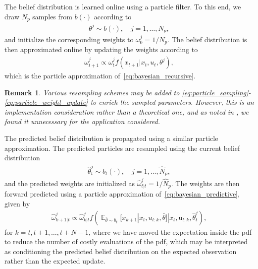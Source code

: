 \documentclass[letterpaper, 10 pt, conference]{IEEEconf}
\newcommand{\Expectation}{\mathop{{}\mathbb{E}}}
\newtheorem{remark}{Remark}
\begin{document}
The belief distribution is learned online using a particle filter. 
To this end, we draw $N_p$ samples from $b(\cdot)$ according to 
\begin{align} \label{eq:particle_sampling}
    \theta^{j} \sim b(\cdot), \quad j = 1, \dots, N_p,
\end{align}
and initialize the corresponding weights to $\omega^{j}_{0} = 1 / N_p$.
The belief distribution is then approximated online by updating the weights according to
\begin{align} \label{eq:particle_weight_update}
    \omega^{j}_{t+1} \propto \omega^{j}_{t} f(x_{t+1} | x_{t}, u_{t}, \theta^{j}),
\end{align}
which is the particle approximation of~\eqref{eq:bayesian_recursive}.
\begin{remark}
    Various resampling schemes may be added to \eqref{eq:particle_sampling}-\eqref{eq:particle_weight_update} to enrich the sampled parameters. However, this is an implementation consideration rather than a theoretical one, and as noted in \cite{knaup2024active}, we found it unnecessary for the application considered.
\end{remark}

The predicted belief distribution is propagated using a similar particle approximation.
The predicted particles are resampled using the current belief distribution
\begin{align} \label{eq:predicted_resampling}
    \hat{\theta}^{j}_{t} \sim b_{t}(\cdot), \quad j = 1, \dots, \hat{N}_p,
\end{align}
and the predicted weights are initialized as $\hat{\omega}^{j}_{t|t} = 1 / \hat{N}_p$.
The weights are then forward predicted using a particle approximation of~\eqref{eq:bayesian_predictive}, given by
\begin{align} \label{eq:predicted_weight_update}
    \hat{\omega}^{j}_{k+1|t} \propto \hat{\omega}^{j}_{k|t} f(\Expectation_{\bar{\theta} \sim b_{t}}[x_{k+1} | x_{t}, u_{t:k}, \bar{\theta}] | x_{t}, \mathrm{u}_{t:k}, \hat{\theta}_{t}^{j}) ,
\end{align}
for $k = t, t+1, \dots, t+N-1$,
where we have moved the expectation inside the pdf to reduce the number of costly evaluations of the pdf,
which may be interpreted as conditioning the predicted belief distribution on the expected observation rather than the expected update. 
\end{document}
